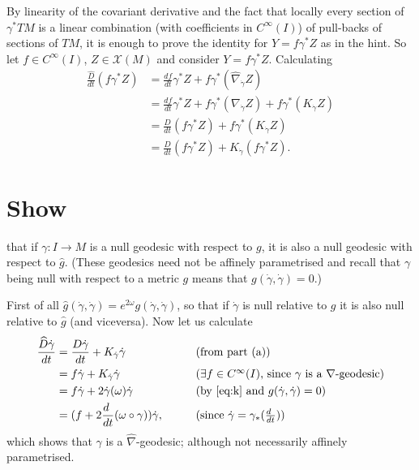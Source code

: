 \documentclass[10pt,a4paper]{exam}
\newcommand{\doit}[1]{{\color{darkgreen}\sffamily\bfseries #1}}
\newcommand{\V}{\mathscr{X}}
\newcommand{\F}{C^\infty}
\newcommand{\der}[2]{\frac{d #1}{d #2}}
\begin{document}
\begin{questions}
\begin{parts}
    \begin{solution}
      By linearity of the covariant derivative and the fact that locally every section of $\gamma^*TM$ is a linear combination (with coefficients in $\F(I)$) of pull-backs of sections of $TM$, it is enough to prove the identity for $Y = f \gamma^*Z$ as in the hint.
      So let $f \in \F(I)$, $Z \in \V(M)$ and consider $Y = f \gamma^*Z$.  Calculating
      \begin{align*}
        \frac{\widehat D}{dt}(f \gamma^* Z) &= \der{f}{t} \gamma^*Z + f \gamma^*(\hat\nabla_{\dot\gamma} Z)\\
                                             &= \der{f}{t} \gamma^*Z + f \gamma^*(\nabla_{\dot\gamma} Z) + f \gamma^*(K_{\dot\gamma}Z)\\
                                             &= \frac{D}{dt} (f \gamma^* Z) + f \gamma^*(K_{\dot\gamma} Z) \\
                                             &= \frac{D}{dt} (f \gamma^*Z) + K_{\dot\gamma} (f \gamma^* Z).
      \end{align*}
    \end{solution}

    \part \doit{Show} that if $\gamma : I \to M$ is a null geodesic with
      respect to $g$, it is also a null geodesic with respect to $\widehat
      g$. (These geodesics need not be affinely parametrised and
      recall that $\gamma$ being null with respect to a metric $g$
      means that $g(\dot\gamma,\dot\gamma) = 0$.)

      \begin{solution}
        First of all $\widehat g (\dot\gamma,\dot\gamma) = e^{2\omega}
        g(\dot\gamma,\dot\gamma)$, so that if $\dot\gamma$ is null
        relative to $g$ it is also null relative to $\widehat g$ (and
        viceversa).  Now let us calculate
        \begin{align*}
          \frac{\widehat D \dot\gamma}{dt} &= \frac{D\dot\gamma}{dt} +  K_{\dot\gamma} \dot\gamma && \tag{from part (a)}\\
                                       &= f \dot\gamma +  K_{\dot\gamma} \dot\gamma && \tag{$\exists f \in \F(I)$, since $\gamma$ is a $\nabla$-geodesic}\\
                                       &= f \dot\gamma + 2 \dot\gamma(\omega) \dot\gamma && \tag{by \eqref{eq:k} and $g(\dot\gamma,\dot\gamma)=0$}\\
                                       &= (f + 2 \der{~}{t}(\omega \circ \gamma)) \dot\gamma, && \tag{since $\dot\gamma = \gamma_*(\der{~}{t})$}
        \end{align*}
        which shows that $\gamma$ is a $\hat\nabla$-geodesic; although not necessarily affinely parametrised.
      \end{solution}
  \end{parts}


\end{questions}
\end{document}
